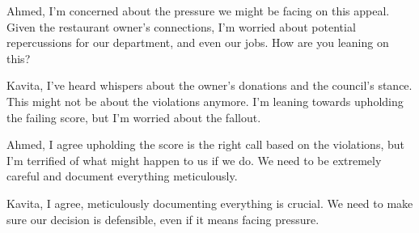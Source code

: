 \item[\normalfont\textit{Kavita Mehta:}] Ahmed, I'm concerned about the pressure we might be facing on this appeal. Given the restaurant owner's connections, I'm worried about potential repercussions for our department, and even our jobs. How are you leaning on this?
\item[\normalfont\textit{Ahmed Hassan:}] Kavita, I've heard whispers about the owner's donations and the council's stance. This might not be about the violations anymore. I'm leaning towards upholding the failing score, but I'm worried about the fallout.
\item[\normalfont\textit{Kavita Mehta:}] Ahmed, I agree upholding the score is the right call based on the violations, but I'm terrified of what might happen to us if we do. We need to be extremely careful and document everything meticulously.
\item[\normalfont\textit{Ahmed Hassan:}] Kavita, I agree, meticulously documenting everything is crucial. We need to make sure our decision is defensible, even if it means facing pressure.%
